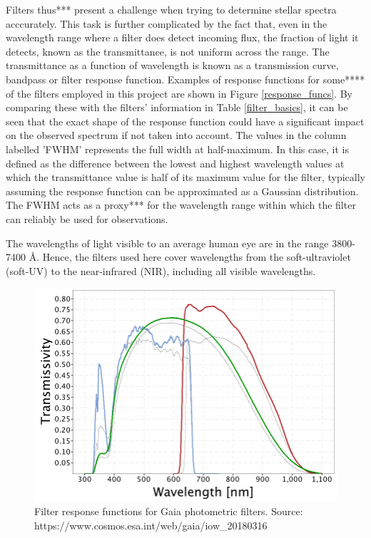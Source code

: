 \documentclass[12pt, a4paper]{report}
\begin{document}
Filters thus*** present a challenge when trying to determine stellar spectra acccurately. This task is further complicated by the fact that, even in the wavelength range where a filter does detect incoming flux, the fraction of light it detects, known as the transmittance, is not uniform across the range. The transmittance as a function of wavelength is known as a transmission curve, bandpass or filter response function. Examples of response functions for some**** of the filters employed in this project are shown in Figure \ref{response_funcs}. By comparing these with the filters' information in Table \ref{filter_basics}, it can be seen that the exact shape of the response function could have a significant impact on the observed spectrum if not taken into account.
The values in the column labelled 'FWHM' represents the full width at half-maximum. In this case, it is defined as the difference between the lowest and highest wavelength values at which the transmittance value is half of its maximum value for the filter, typically assuming the response function can be approximated as a Gaussian distribution. The FWHM acts as a proxy*** for the wavelength range within which the filter can reliably be used for observations.

The wavelengths of light visible to an average human eye are in the range 3800-7400 \AA . Hence, the filters used here cover wavelengths from the soft-ultraviolet (soft-UV) to the near-infrared (NIR),  including all visible wavelengths.

\begin{figure}[h]
\begin{center}
\includegraphics[scale=0.5]{GaiaDR2Passbands.png}
\caption{Filter response functions for Gaia photometric filters. Source: https://www.cosmos.esa.int/web/gaia/iow_20180316}
\label{ACS_response_funcs}
\end{center}
\end{figure}
\end{document}
